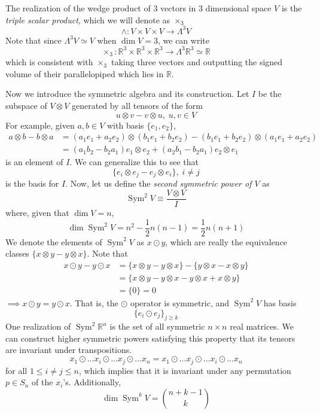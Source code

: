 \documentclass{article}
\DeclareMathOperator{\Sym}{Sym}
\begin{document}
    \begin{example}
    The realization of the wedge product of 3 vectors in 3 dimensional space $V$ is the \textit{triple scalar product}, which we will denote as $\times_3$
    \[\wedge: V \times V \times V \longrightarrow \Lambda^3 V\]
    Note that since $\Lambda^3 V \simeq V$ when $\dim{V} = 3$, we can write 
    \[\times_3: \mathbb{R}^3 \times \mathbb{R}^3 \times \mathbb{R}^3 \longrightarrow \Lambda^3 \mathbb{R}^3 \simeq \mathbb{R}\]
    which is consistent with $\times_3$ taking three vectors and outputting the signed volume of their parallelopiped which lies in $\mathbb{R}$. 
    \end{example}

    Now we introduce the symmetric algebra and its construction. Let $I$ be the subspace of $V \otimes V$ generated by all tensors of the form 
    \[u \otimes v - v \otimes u, \; u, v \in V\]
    For example, given $a, b \in V$ with basis $\{e_1, e_2\}$, 
    \begin{align*}
        a \otimes b - b \otimes a & = (a_1 e_1 + a_2 e_2) \otimes (b_1 e_1 + b_2 e_2) - (b_1 e_1 + b_2 e_2) \otimes (a_1 e_1 + a_2 e_2) \\
        & = (a_1 b_2 - b_2 a_1) e_1 \otimes e_2 + (a_2 b_1 - b_2 a_1) e_2 \otimes e_1 
    \end{align*}
    is an element of $I$. We can generalize this to see that
    \[\{e_i \otimes e_j - e_j \otimes e_i\}, \; i \neq j\]
    is the basis for $I$. Now, let us define the \textit{second symmetric power of $V$} as 
    \[\Sym^2 V \equiv \frac{V \otimes V}{I}\]
    where, given that $\dim{V} = n$, 
    \[\dim{\Sym^2 V} = n^2 - \frac{1}{2} n (n-1) = \frac{1}{2} n (n+1)\]
    We denote the elements of $\Sym^2 V$ as $x \odot y$, which are really the equivalence classes $\{x \otimes y - y \otimes x\}$. Note that
    \begin{align*}
        x \odot y - y \odot x & = \{x \otimes y - y \otimes x\} - \{ y \otimes x - x \otimes y\} \\
        & = \{ x \otimes y - y \otimes x - y \otimes x + x \otimes y\} \\
        & = \{0\} = 0
    \end{align*}
    $\implies x \odot y = y \odot x$. That is, the $\odot$ operator is symmetric, and $\Sym^2 V$ has basis 
    \[ \{e_i \odot e_j\}_{j \geq k}\]
    One realization of $\Sym^2 \mathbb{R}^n$ is the set of all symmetric $n \times n$ real matrices. We can construct higher symmetric powers satisfying this property that its tensors are invariant under transpositions. 
    \[x_1 \odot ... x_i \odot ... x_j \odot ... x_n = x_1 \odot ... x_j \odot ... x_i \odot ... x_n\]
    for all $1 \leq i \neq j \leq n$, which implies that it is invariant under any permutation $p \in S_n$ of the $x_i$'s. Additionally, 
    \[\dim{\Sym^k V} = \binom{n+k-1}{k}\]
\end{document}
